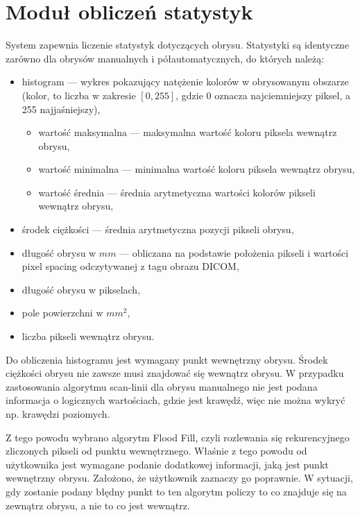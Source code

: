 \documentclass[a4paper,11pt,twoside,openright]{report}
\theoremstyle{definition}
\begin{document}
\section {Moduł obliczeń statystyk}

System zapewnia liczenie statystyk dotyczących obrysu. Statystyki są identyczne
zarówno dla obrysów manualnych i półautomatycznych, do których należą:

\begin{itemize}[noitemsep]
\item histogram --- wykres pokazujący natężenie kolorów w obrysowanym obszarze
(kolor, to liczba w zakresie $[0,255]$, gdzie 0 oznacza najciemniejszy piksel,
a 255 najjaśniejszy),
\begin{itemize}[noitemsep]
\item wartość maksymalna --- maksymalna wartość koloru piksela wewnątrz obrysu,
\item wartość minimalna --- minimalna wartość koloru piksela wewnątrz obrysu,
\item wartość średnia --- średnia arytmetyczna wartości kolorów pikseli wewnątrz obrysu,
\end{itemize}
\item środek ciężkości --- średnia arytmetyczna pozycji pikseli obrysu,
\item długość obrysu w $mm$ --- obliczana na podstawie położenia pikseli i %
wartości pixel spacing odczytywanej z tagu obrazu DICOM,
\item długość obrysu w pikselach,
\item pole powierzchni w $mm^2$,
\item liczba pikseli wewnątrz obrysu.
\end{itemize}

Do obliczenia histogramu jest wymagany punkt wewnętrzny obrysu. Środek ciężkości
obrysu nie zawsze musi znajdować się wewnątrz obrysu. W przypadku zastosowania
algorytmu scan-linii dla obrysu manualnego nie jest podana informacja o logicznych
wartościach, gdzie jest krawędź, więc nie można wykryć np. krawędzi poziomych.

Z tego powodu wybrano algorytm Flood Fill, czyli rozlewania się rekurencyjnego %
zliczonych pikseli od punktu wewnętrznego. Właśnie z tego powodu od użytkownika
jest wymagane podanie dodatkowej informacji, jaką jest punkt wewnętrzny obrysu.
Założono, że użytkownik zaznaczy go poprawnie. W sytuacji, gdy zostanie podany
błędny punkt to ten algorytm policzy to co znajduje się na zewnątrz obrysu, a
nie to co jest wewnątrz.
\end{document}
